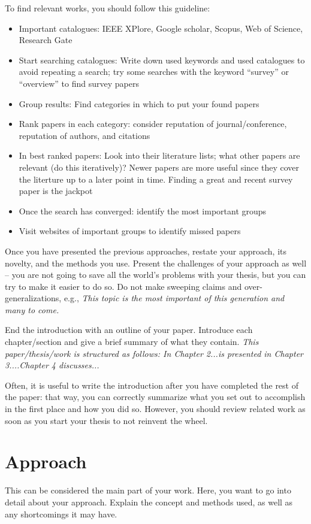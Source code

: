 To find relevant works, you should follow this guideline:
\begin{itemize}
\item Important catalogues: IEEE XPlore, Google scholar, Scopus, Web of Science, Research Gate
\item Start searching catalogues: Write down used keywords and used catalogues to avoid repeating a search; try some searches with the keyword ``survey'' or ``overview'' to find survey papers
\item Group results: Find categories in which to put your found papers
\item Rank papers in each category: consider reputation of journal/conference, reputation of authors, and citations 
\item In best ranked papers: Look into their literature lists; what other papers are relevant (do this iteratively)? Newer papers are more useful since they cover the literture up to a later point in time. Finding a great and recent survey paper is the jackpot
\item Once the search has converged: identify the most important groups
\item Visit websites of important groups to identify missed papers
\end{itemize}

Once you have presented the previous approaches, restate your approach, its novelty, and the methods you use. Present the challenges of your approach as well -- you are not going to save all the world's problems with your thesis, but you can try to make it easier to do so. Do not make sweeping claims and over-generalizations, e.g., \textit{This topic is the most important of this generation and many to come.}

End the introduction with an outline of your paper. Introduce each chapter/section and give a brief summary of what they contain. \textit{This paper/thesis/work is structured as follows: In Chapter 2...is presented in Chapter 3....Chapter 4 discusses...}

Often, it is useful to write the introduction after you have completed the rest of the paper: that way, you can correctly summarize what you set out to accomplish in the first place and how you did so. However, you should review related work as soon as you start your thesis to not reinvent the wheel.


\section{Approach}
This can be considered the main part of your work. Here, you want to go into detail about your approach. Explain the concept and methods used, as well as any shortcomings it may have. 

